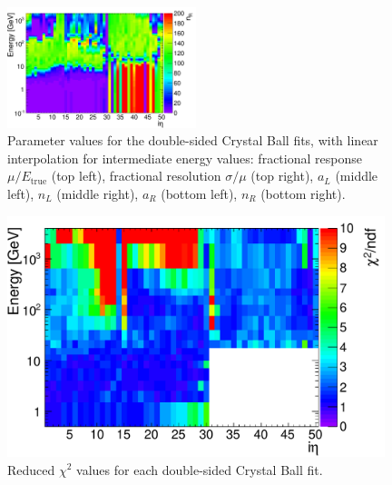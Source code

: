 \begin{figure}[hbtp]
\begin{center}
\includegraphics[width=0.49\textwidth]{figures/nR_tot_interp.png}
\caption{Parameter values for the double-sided Crystal Ball fits, with linear interpolation for intermediate energy values: fractional response $\mu/E_{\text{true}}$ (top left), fractional resolution $\sigma/\mu$ (top right), $a_{L}$ (middle left), $n_{L}$ (middle right), $a_{R}$ (bottom left), $n_{R}$ (bottom right).}
\label{fig:cballD-params}
\end{center}
\end{figure}

\begin{figure}[hbtp]
  \begin{center}
    \includegraphics[width=0.98\textwidth]{figures/chi2_tot.pdf}
    \caption{Reduced $\chi^{2}$ values for each double-sided Crystal Ball fit.}
    \label{fig:cballD-chi2}
  \end{center}
\end{figure}


